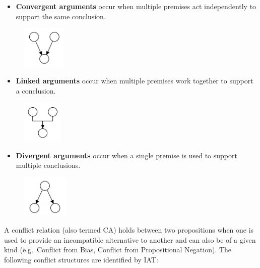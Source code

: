\documentclass[twocolumn,twoside]{article}
\providecommand{\tightlist}{%
  \setlength{\itemsep}{0pt}\setlength{\parskip}{0pt}}
\begin{document}
\begin{itemize}
\tightlist
\item
  \textbf{Convergent arguments} occur when multiple premises act
  independently to support the same conclusion.
\end{itemize}

\begin{figure}[H]
    \centering
    \includegraphics[height=2cm]{convergent}
\end{figure}

\begin{itemize}
\tightlist
\item
  \textbf{Linked arguments} occur when multiple premises work together
  to support a conclusion.
\end{itemize}

\begin{figure}[H]
    \centering
    \includegraphics[height=2cm]{linked}
\end{figure}

\begin{itemize}
\tightlist
\item
  \textbf{Divergent arguments} occur when a single premise is used to
  support multiple conclusions.
\end{itemize}

\begin{figure}[H]
    \centering
    \includegraphics[height=2cm]{divergent}
\end{figure}

A conflict relation (also termed CA) holds between two propositions when
one is used to provide an incompatible alternative to another and can
also be of a given kind (e.g.~Conflict from Bias, Conflict from
Propositional Negation). The following conflict structures are
identified by IAT:
\end{document}
